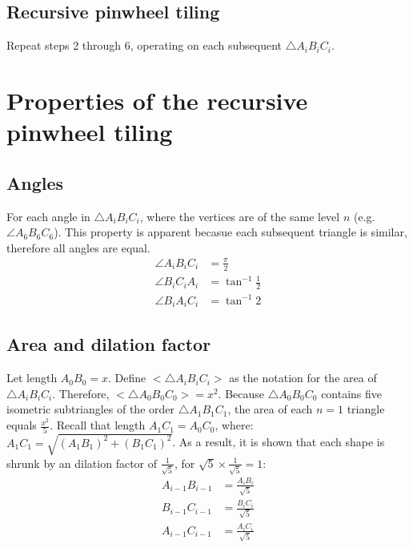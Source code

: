 

\subsection{Recursive pinwheel tiling}
Repeat steps 2 through 6, operating on each subsequent $\triangle A_{i}B_{i}C_{i}$.


\newpage



\section{Properties of the recursive pinwheel tiling}
\subsection{Angles}
For each angle in $\triangle A_{i}B_{i}C_{i}$, where the vertices are of the same level $n$ (e.g. $\angle A_{6}B_{6}C_{6}$). This property is apparent becasue each subsequent triangle is similar, therefore all angles are equal.
\begin{equation}
    \begin{aligned}
        \angle A_{i}B_{i}C_{i} &= \frac{\pi}{2} \\
        \angle B_{i}C_{i}A_{i} &= \tan^{-1}\frac{1}{2} \\
        \angle B_{i}A_{i}C_{i} &= \tan^{-1}2
    \end{aligned}
\end{equation}

\subsection{Area and dilation factor}
Let length $A_{0}B_{0} = x$. Define $\big<\triangle A_{i}B_{i}C_{i}\big>$ as the notation for the area of $\triangle A_{i}B_{i}C_{i}$. Therefore, $\big<\triangle A_{0}B_{0}C_{0}\big> = x^2$. Because $\triangle A_{0}B_{0}C_{0}$ contains five isometric subtriangles of the order $\triangle A_{1}B_{1}C_{1}$, the area of each $n = 1$ triangle equals $\frac{x^2}{5}$. Recall that length $A_{1}C_{1} = A_{0}C_{0}$, where: $A_{1}C_{1} = \sqrt{(A_{1}B_{1})^2 + (B_{1}C_{1})^2}$. As a result, it is shown that each shape is shrunk by an dilation factor of $\frac{1}{\sqrt{5}}$, for $\sqrt{5} \times \frac{1}{\sqrt{5}} = 1$:
\begin{equation}
    \begin{aligned}
        A_{i-1}B_{i-1} &= \frac{A_{i}B_{i}}{\sqrt{5}} \\
        B_{i-1}C_{i-1} &= \frac{B_{i}C_{i}}{\sqrt{5}} \\
        A_{i-1}C_{i-1} &= \frac{A_{i}C_{i}}{\sqrt{5}}
    \end{aligned}
\end{equation}

